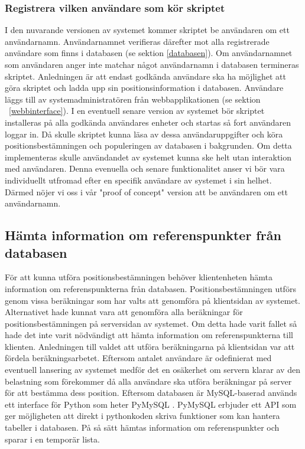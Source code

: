 \documentclass[swedish, a4paper,12pt]{article}
\begin{document}
\subsubsection{Registrera vilken användare som kör skriptet}
I den nuvarande versionen av systemet kommer skriptet be användaren om ett användarnamn. Användarnamnet verifieras därefter mot alla registrerade användare som finns i databasen (se sektion \ref{databasen}). Om användarnamnet som användaren anger inte matchar något användarnamn i databasen termineras skriptet. Anledningen är att endast godkända användare ska ha möjlighet att göra skriptet och ladda upp sin positionsinformation i databasen. Användare läggs till av systemadministratören från webbapplikationen (se sektion ~\ref{webbinterface}). I en eventuell senare version av systemet bör skriptet installeras på alla godkända användares enheter och startas så fort användaren loggar in. Då skulle  skriptet kunna läsa av dessa användaruppgifter och köra positionsbestämningen och populeringen av databasen i bakgrunden. Om detta implementeras skulle användandet av systemet kunna ske helt utan interaktion med användaren. Denna evenuella och senare funktionalitet anser vi bör vara individuellt utfromad efter en specifik användare av systemet i sin helhet. Därmed nöjer vi oss i vår "proof of concept" version att be användaren om ett användarnamn. %

\subsection{Hämta information om referenspunkter från databasen}\label{HamtaInfoDB}
För att kunna utföra positionsbestämningen behöver klientenheten hämta information om referenspunkterna från databasen. Positionsbestämningen utförs genom vissa beräkningar som har valts att genomföra på klientsidan av systemet. Alternativet hade kunnat vara att genomföra alla beräkningar för positionsbestämningen på serversidan av systemet. Om detta hade varit fallet så hade det inte varit nödvändigt att hämta information om referenspunkterna till klienten. Anledningen till valdet att utföra beräkningarna på klientsidan var att fördela beräkningsarbetet. Eftersom antalet användare är odefinierat med eventuell lansering av systemet medför det en osäkerhet om servern klarar av den belastning som förekommer då alla användare ska utföra beräkningar på server för att bestämma dess position. Eftersom databasen är MySQL-baserad används ett interface för Python som heter PyMySQL\cite{mysqldb}%
. PyMySQL erbjuder ett API som ger möjligheten att direkt i pythonkoden skriva funktioner som kan hantera tabeller i databasen. På så sätt hämtas information om referenspunkter och sparar i en temporär lista. %
\end{document}
